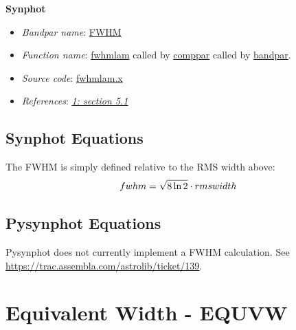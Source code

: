 \documentclass[letterpaper,10pt,english]{sphinxtsr}
\begin{document}
\textbf{Synphot}
\begin{itemize}
\item {} 
\emph{Bandpar name}: \href{https://svn.stsci.edu/trac/ssb/stsci\_python/browser/stsdas/trunk/stsdas/pkg/hst\_calib/synphot/doc/bandpar.hlp}{FWHM}

\item {} 
\emph{Function name}: \href{https://svn.stsci.edu/trac/ssb/stsci\_python/browser/stsdas/trunk/stsdas/lib/synphot/fwhmlam.x}{fwhmlam}
called by \href{https://svn.stsci.edu/trac/ssb/stsci\_python/browser/stsdas/trunk/stsdas/pkg/hst\_calib/synphot/bandpar/comppar.x}{comppar} called by \href{https://svn.stsci.edu/trac/ssb/stsci\_python/browser/stsdas/trunk/stsdas/pkg/hst\_calib/synphot/bandpar/bandpar.x}{bandpar}.

\item {} 
\emph{Source code}: \href{https://svn.stsci.edu/trac/ssb/stsci\_python/browser/stsdas/trunk/stsdas/lib/synphot/fwhmlam.x}{fwhmlam.x}

\item {} 
\emph{References}: {\hyperref[references:ref1]{\emph{1: section 5.1}}}

\end{itemize}


\section{Synphot Equations}
\label{main:id3}
The FWHM is simply defined relative to the RMS width above:
\begin{gather}
\begin{split}fwhm = \sqrt{8\ln 2}\cdot rmswidth\end{split}\notag
\end{gather}

\section{Pysynphot Equations}
\label{main:id4}
Pysynphot does not currently implement a FWHM calculation.
See \href{https://trac.assembla.com/astrolib/ticket/139}{https://trac.assembla.com/astrolib/ticket/139}.


\chapter{Equivalent Width - EQUVW}
\label{main:equivalent-width-equvw}
\end{document}
